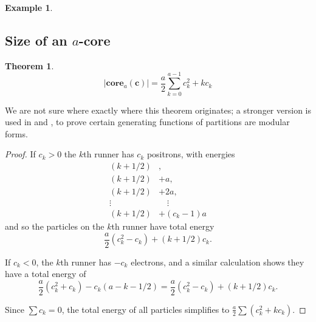 \documentclass{amsart}[12pt]
\theoremstyle{definition}
\newtheorem{theorem}[dummy]{Theorem}
\newtheorem{example}[dummy]{Example}
\newcommand{\core}{\mathbf{core}}
\begin{document}
\begin{example}
\begin{center}
\end{center}
\end{example}




\subsection{Size of an \texorpdfstring{$a$}{a}-core}


\begin{theorem} \label{thm:quadratic}
$$|\core_a(\mathbf{c})|=\frac{a}{2}\sum_{k=0}^{a-1} c_k^2+ kc_k$$
\end{theorem}

We are not sure where exactly where this theorem originates; a stronger version is used in \cite{GKS} and \cite{DS}, to prove certain generating
functions of partitions are modular forms.

\begin{proof}
 If  $c_k>0$ the $k$th runner has $c_k$ positrons, with
 energies 
\begin{align*}
(k+1/2)&,\\
(k+1/2)&+a, \\
(k+1/2)&+2a,\\
\vdots\quad &\quad \vdots \\
 (k+1/2)&+(c_k-1)a
\end{align*}
 and so the
 particles on the $k$th runner have total energy
 $$\frac{a}{2}(c_k^2-c_k)+(k+1/2)c_k.$$

 If $c_k<0$, the $k$th runner has $-c_k$ electrons, and a similar calculation shows they have a total energy of $$\frac{a}{2}(c_k^2+c_k)-c_k(a-k-1/2)=\frac{a}{2}(c_k^2-c_k)+(k+1/2)c_k.$$

Since $\sum c_k=0$, the total energy of all particles simplifies to $\frac{a}{2}\sum (c_k^2+kc_k)$.
\end{proof}
\end{document}
